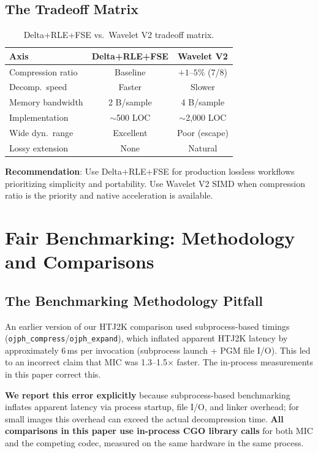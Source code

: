\documentclass[10pt,twocolumn]{article}
\begin{document}
\subsection{The Tradeoff Matrix}

\begin{table}[h]
  \centering
  \caption{Delta+RLE+FSE vs.\ Wavelet V2 tradeoff matrix.}
  \label{tab:tradeoff}
  \small
  \begin{tabular}{lcc}
    \toprule
    Axis & Delta+RLE+FSE & Wavelet V2 \\
    \midrule
    Compression ratio & Baseline & $+1$--$5\%$ (7/8) \\
    Decomp.\ speed & Faster & Slower \\
    Memory bandwidth & 2 B/sample & 4 B/sample \\
    Implementation & $\sim$500 LOC & $\sim$2,000 LOC \\
    Wide dyn.\ range & Excellent & Poor (escape) \\
    Lossy extension & None & Natural \\
    \bottomrule
  \end{tabular}
\end{table}

\textbf{Recommendation}: Use Delta+RLE+FSE for production lossless workflows prioritizing simplicity and portability. Use Wavelet V2 SIMD when compression ratio is the priority and native acceleration is available.

\section{Fair Benchmarking: Methodology and Comparisons}
\label{sec:benchmethod}

\subsection{The Benchmarking Methodology Pitfall}

An earlier version of our HTJ2K comparison used subprocess-based timings (\texttt{ojph\_compress}/\texttt{ojph\_expand}), which inflated apparent HTJ2K latency by approximately 6\,ms per invocation (subprocess launch + PGM file I/O). This led to an incorrect claim that MIC was 1.3--1.5$\times$ faster. The in-process measurements in this paper correct this.

\textbf{We report this error explicitly} because subprocess-based benchmarking inflates apparent latency via process startup, file I/O, and linker overhead; for small images this overhead can exceed the actual decompression time. \textbf{All comparisons in this paper use in-process CGO library calls} for both MIC and the competing codec, measured on the same hardware in the same process.
\end{document}

